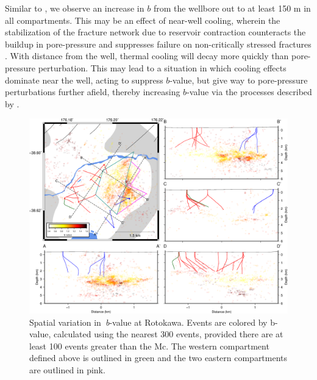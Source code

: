 Similar to \citet{Bachmann_2012}, we observe an increase in $b$ from the wellbore out to at least 150 m in all compartments. This may be an effect of near-well cooling, wherein the stabilization of the fracture network due to reservoir contraction counteracts the buildup in pore-pressure and suppresses failure on non-critically stressed fractures \citep{Jeanne_2015tensor}. With distance from the well, thermal cooling will decay more quickly than pore-pressure perturbation. This may lead to a situation in which cooling effects dominate near the well, acting to suppress $b$-value, but give way to pore-pressure perturbations further afield, thereby increasing $b$-value via the processes described by \citet{Bachmann_2012}.

\begin{figure}[h!]
\begin{center}
\includegraphics[width=1.00\columnwidth]{Chapter_4_Rot/figures/merc_Rot_dets_just_GC_bval_map/merc_Rot_dets_just_GC_bval_map_PS_max300_min100_maxlike_comps_original}
\caption{{Spatial variation in~\emph{b}-value at Rotokawa. Events are colored by
b-value, calculated using the nearest 300 events, provided there are at
least 100 events greater than the Mc. The western compartment defined
above is outlined in green and the two eastern compartments are outlined
in pink.
{\label{610416}}%
}}
\end{center}
\end{figure}

